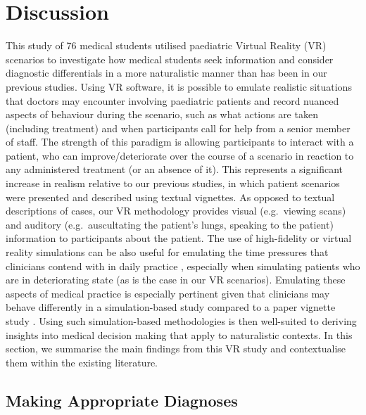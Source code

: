 \documentclass[a4paper, nobind]{templates/ociamthesis}
\begin{document}
\section{Discussion}\label{discussion-3}

This study of 76 medical students utilised paediatric Virtual Reality (VR) scenarios to investigate how medical students seek information and consider diagnostic differentials in a more naturalistic manner than has been in our previous studies. Using VR software, it is possible to emulate realistic situations that doctors may encounter involving paediatric patients and record nuanced aspects of behaviour during the scenario, such as what actions are taken (including treatment) and when participants call for help from a senior member of staff. The strength of this paradigm is allowing participants to interact with a patient, who can improve/deteriorate over the course of a scenario in reaction to any administered treatment (or an absence of it). This represents a significant increase in realism relative to our previous studies, in which patient scenarios were presented and described using textual vignettes. As opposed to textual descriptions of cases, our VR methodology provides visual (e.g.~viewing scans) and auditory (e.g.~auscultating the patient's lungs, speaking to the patient) information to participants about the patient. The use of high-fidelity or virtual reality simulations can be also useful for emulating the time pressures \autocite{schmidt_simulation_2013,jans_examining_2023} that clinicians contend with in daily practice \autocite{yates_physician_2020}, especially when simulating patients who are in deteriorating state (as is the case in our VR scenarios). Emulating these aspects of medical practice is especially pertinent given that clinicians may behave differently in a simulation-based study compared to a paper vignette study \autocite{yang2012}. Using such simulation-based methodologies is then well-suited to deriving insights into medical decision making that apply to naturalistic contexts. In this section, we summarise the main findings from this VR study and contextualise them within the existing literature.

\subsection{Making Appropriate Diagnoses}\label{making-appropriate-diagnoses}
\end{document}
